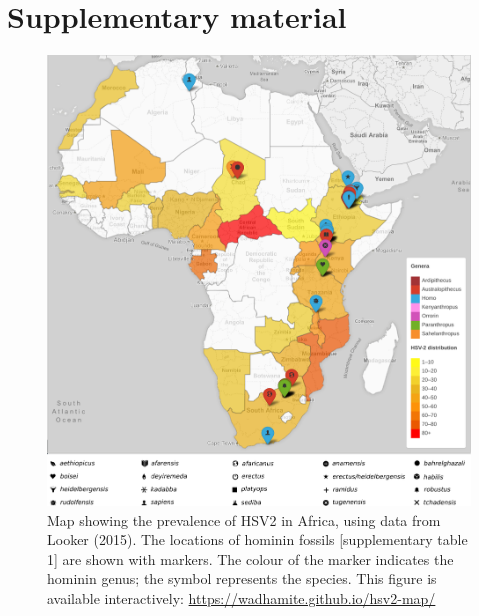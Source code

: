 \documentclass[fleqn,10pt]{wlscirep}
\begin{document}
\printbibliography

\clearpage
\section*{Supplementary material}
\renewcommand\thefigure{A.\arabic{figure}}    
\setcounter{figure}{0} 
\renewcommand\thetable{A.\arabic{figure}}    
\setcounter{table}{0} 

\begin{figure}[!h]
	\centering
	\includegraphics[width=\textwidth]{figs/fossils}
	\caption{Map showing the prevalence of HSV2 in Africa, using data from Looker (2015). The locations of hominin fossils [supplementary table 1] are shown with markers. The colour of the marker indicates the hominin genus; the symbol represents the species. 
This figure is available interactively: \url{https://wadhamite.github.io/hsv2-map/}}
	\label{fig:hsv2}   
\end{figure}  
\end{document}

